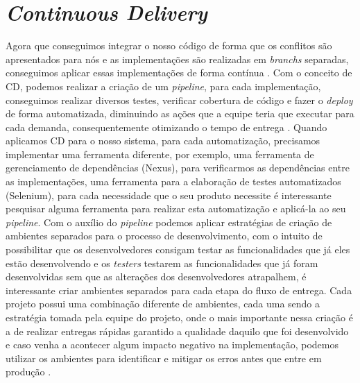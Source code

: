       \section{\textit{Continuous Delivery}}
        Agora que conseguimos integrar o nosso código de forma que os conflitos são
        apresentados para nós e as implementações são realizadas em \textit{branchs}
        separadas, conseguimos aplicar essas implementações de forma contínua
        \cite{TheDevOpsHandbook}. Com o conceito de CD, podemos realizar a criação
        de um \textit{pipeline}, para cada implementação, conseguimos realizar
        diversos testes, verificar cobertura de código e fazer o \textit{deploy}
        de forma automatizada, diminuindo as ações que a equipe teria que executar
        para cada demanda, consequentemente otimizando o tempo de entrega
        \cite{ContinuousDelivery}. Quando aplicamos CD para o nosso sistema,
        para cada automatização, precisamos implementar uma ferramenta diferente,
        por exemplo, uma ferramenta de gerenciamento de dependências (Nexus),
        para verificarmos as dependências entre as implementações, uma ferramenta
        para a elaboração de testes automatizados (Selenium), para cada necessidade
        que o seu produto necessite é interessante pesquisar alguma ferramenta para
        realizar esta automatização e aplicá-la ao seu \textit{pipeline}. \newline
        Com o auxílio do \textit{pipeline} podemos aplicar estratégias de criação
        de ambientes separados para o processo de desenvolvimento, com o intuito de
        possibilitar que os desenvolvedores consigam testar as funcionalidades que
        já eles estão desenvolvendo e os \textit{testers} testarem as funcionalidades
        que já foram desenvolvidas sem que as alterações dos desenvolvedores
        atrapalhem, é interessante criar ambientes separados para cada etapa do
        fluxo de entrega. \newline
        Cada projeto possui uma combinação diferente de ambientes, cada uma sendo
        a estratégia tomada pela equipe do projeto, onde o mais importante nessa
        criação é a de realizar entregas rápidas garantido a qualidade daquilo
        que foi desenvolvido e caso venha a acontecer algum impacto negativo na
        implementação, podemos utilizar os ambientes para identificar e mitigar
        os erros antes que entre em produção \cite{TheDevOpsHandbook}. \newline

